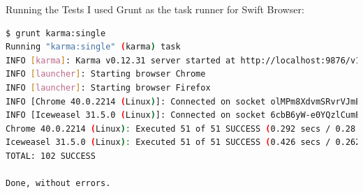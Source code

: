 \documentclass[t,noamsthm]{beamer}
\begin{document}
\begin{frame}[fragile]{Running the Tests}
  I used Grunt as the task runner for Swift Browser:
\begin{lstlisting}[language=sh, basicstyle=\tiny\ttfamily]
$ grunt karma:single
Running "karma:single" (karma) task
INFO [karma]: Karma v0.12.31 server started at http://localhost:9876/v1/AUTH_abc/container/
INFO [launcher]: Starting browser Chrome
INFO [launcher]: Starting browser Firefox
INFO [Chrome 40.0.2214 (Linux)]: Connected on socket olMPm8XdvmSRvrVJmEDz with id 24050271
INFO [Iceweasel 31.5.0 (Linux)]: Connected on socket 6cbB6yW-e0YQzlCumED0 with id 62219617
Chrome 40.0.2214 (Linux): Executed 51 of 51 SUCCESS (0.292 secs / 0.28 secs)
Iceweasel 31.5.0 (Linux): Executed 51 of 51 SUCCESS (0.426 secs / 0.262 secs)
TOTAL: 102 SUCCESS

Done, without errors.
\end{lstlisting}
\end{frame}
\end{document}
